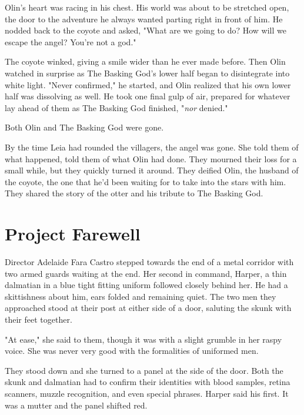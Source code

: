 Olin's heart was racing in his chest. His world was about to be stretched open, the door to the adventure he always wanted parting right in front of him. He nodded back to the coyote and asked, "What are we going to do? How will we escape the angel? You're not a god."

The coyote winked, giving a smile wider than he ever made before. Then Olin watched in surprise as The Basking God's lower half began to disintegrate into white light. "Never confirmed," he started, and Olin realized that his own lower half was dissolving as well. He took one final gulp of air, prepared for whatever lay ahead of them as The Basking God finished, "\emph{nor} denied."

Both Olin and The Basking God were gone.

By the time Leia had rounded the villagers, the angel was gone. She told them of what happened, told them of what Olin had done. They mourned their loss for a small while, but they quickly turned it around. They deified Olin, the husband of the coyote, the one that he'd been waiting for to take into the stars with him. They shared the story of the otter and his tribute to The Basking God.

\cleartoverso


\chapter*{Project Farewell}


Director Adelaide Fara Castro stepped towards the end of a metal corridor with two armed guards waiting at the end. Her second in command, Harper, a thin dalmatian in a blue tight fitting uniform followed closely behind her. He had a skittishness about him, ears folded and remaining quiet. The two men they approached stood at their post at either side of a door, saluting the skunk with their feet together.

"At ease," she said to them, though it was with a slight grumble in her raspy voice. She was never very good with the formalities of uniformed men.

They stood down and she turned to a panel at the side of the door. Both the skunk and dalmatian had to confirm their identities with blood samples, retina scanners, muzzle recognition, and even special phrases. Harper said his first. It was a mutter and the panel shifted red.

